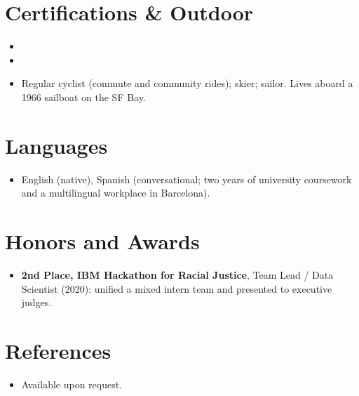 \documentclass[11pt,a4paper,sans]{moderncv}
\begin{document}

\section{Certifications \& Outdoor}
\vspace{1pt}
\begin{itemize}

\item{}

\vspace{3pt}

\item{}

\vspace{3pt}

\item Regular cyclist (commute and community rides); skier; sailor. Lives aboard a 1966 sailboat on the SF Bay.

\end{itemize}


\section{Languages}
\vspace{1pt}
\begin{itemize}
\item English (native), Spanish (conversational; two years of university coursework and a multilingual workplace in Barcelona).
\end{itemize}


\section{Honors and Awards}
\vspace{1pt}
\begin{itemize}
\item{\textbf{2nd Place, IBM Hackathon for Racial Justice}, Team Lead / Data Scientist (2020): unified a mixed intern team and presented to executive judges.}
\end{itemize}


\section{References}
\vspace{1pt}
\begin{itemize}
\item{Available upon request.}
\end{itemize}
\end{document}
